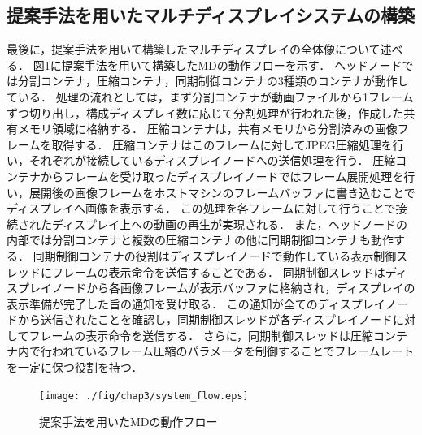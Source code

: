 \subsection*{提案手法を用いたマルチディスプレイシステムの構築}
最後に，提案手法を用いて構築したマルチディスプレイの全体像について述べる．
図\ref{system_flow_teian}に提案手法を用いて構築したMDの動作フローを示す．
ヘッドノードでは分割コンテナ，圧縮コンテナ，同期制御コンテナの3種類のコンテナが動作している．
処理の流れとしては，まず分割コンテナが動画ファイルから1フレームずつ切り出し，構成ディスプレイ数に応じて分割処理が行われた後，作成した共有メモリ領域に格納する．
圧縮コンテナは，共有メモリから分割済みの画像フレームを取得する．
圧縮コンテナはこのフレームに対してJPEG圧縮処理を行い，それぞれが接続しているディスプレイノードへの送信処理を行う．
圧縮コンテナからフレームを受け取ったディスプレイノードではフレーム展開処理を行い，展開後の画像フレームをホストマシンのフレームバッファに書き込むことでディスプレイへ画像を表示する．
この処理を各フレームに対して行うことで接続されたディスプレイ上への動画の再生が実現される．
また，ヘッドノードの内部では分割コンテナと複数の圧縮コンテナの他に同期制御コンテナも動作する．
同期制御コンテナの役割はディスプレイノードで動作している表示制御スレッドにフレームの表示命令を送信することである．
同期制御スレッドはディスプレイノードから各画像フレームが表示バッファに格納され，ディスプレイの表示準備が完了した旨の通知を受け取る．
この通知が全てのディスプレイノードから送信されたことを確認し，同期制御スレッドが各ディスプレイノードに対してフレームの表示命令を送信する．
さらに，同期制御スレッドは圧縮コンテナ内で行われているフレーム圧縮のパラメータを制御することでフレームレートを一定に保つ役割を持つ．


\begin{figure}[H]
    \hspace*{\fill}
    \texttt{[image: ./fig/chap3/system\_flow.eps]}
    \hspace*{\fill}
    \caption{提案手法を用いたMDの動作フロー}
    \label{system_flow_teian}
\end{figure}
